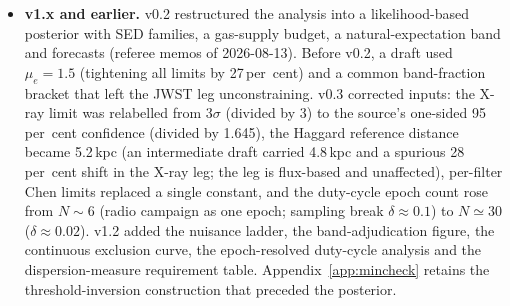 \documentclass[11pt]{article}
\begin{document}
\begin{itemize}
\item \textbf{v1.x and earlier.} v0.2 restructured the analysis into a likelihood-based posterior with SED families, a gas-supply budget, a natural-expectation band and forecasts (referee memos of 2026-08-13). Before v0.2, a draft used $\mu_{e} = 1.5$ (tightening all limits by 27\,per~cent) and a common band-fraction bracket that left the JWST leg unconstraining. v0.3 corrected inputs: the X-ray limit was relabelled from $3\sigma$ (divided by 3) to the source's one-sided 95\,per~cent confidence (divided by 1.645), the Haggard reference distance became 5.2\,kpc (an intermediate draft carried 4.8\,kpc and a spurious 28\,per~cent shift in the X-ray leg; the leg is flux-based and unaffected), per-filter Chen limits replaced a single constant, and the duty-cycle epoch count rose from $N \sim 6$ (radio campaign as one epoch; sampling break $\delta \approx 0.1$) to $N \simeq 30$ ($\delta \approx 0.02$). v1.2 added the nuisance ladder, the band-adjudication figure, the continuous exclusion curve, the epoch-resolved duty-cycle analysis and the dispersion-measure requirement table. Appendix~\ref{app:mincheck} retains the threshold-inversion construction that preceded the posterior.
\end{itemize}




\end{document}
